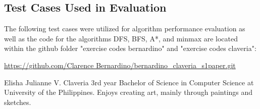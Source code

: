 \documentclass[journal]{./IEEE/IEEEtran}
\begin{document}
\subsection{Test Cases Used in Evaluation}
The following test cases were utilized for algorithm performance evaluation as well as the code for the algorithms DFS, BFS, A*, and minmax are located within the github folder "exercise codes bernardino" and "exercise codes claveria":

\url{https://github.com/Clarence Bernardino/bernardino_claveria_s1paper.git}






\begin{biography}{Elisha Julianne V. Claveria} 3rd year Bachelor of Science in Computer Science at University of the Philippines. Enjoys creating art, mainly through paintings and sketches.  
\end{biography}
\end{document}

